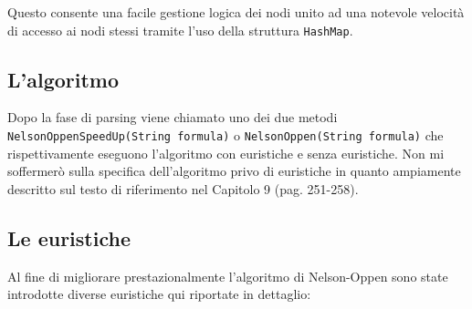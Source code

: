 \documentclass[a4paper,11pt]{article}
\begin{document}
Questo consente una facile gestione logica dei nodi unito ad una notevole velocità di accesso ai nodi stessi tramite l'uso della struttura {\tt HashMap}.

\subsection{L'algoritmo}
Dopo la fase di parsing viene chiamato uno dei due metodi {\tt NelsonOppenSpeedUp(String formula)} o {\tt NelsonOppen(String formula)} che rispettivamente eseguono l'algoritmo con euristiche e senza euristiche.
Non mi soffermerò sulla specifica dell'algoritmo privo di euristiche in quanto ampiamente descritto sul testo di riferimento nel Capitolo 9 (pag. 251-258).

\subsection{Le euristiche}
Al fine di migliorare prestazionalmente l'algoritmo di Nelson-Oppen sono state introdotte diverse euristiche qui riportate in dettaglio:
\end{document}
